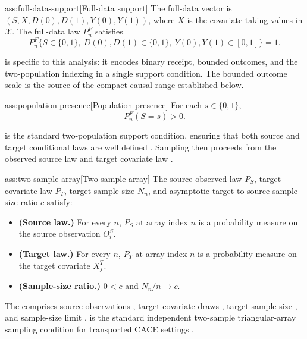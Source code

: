 \documentclass[11pt]{article}
\begin{document}
\begin{assumptionv}{ass:full-data-support}[Full-data support]
The full-data vector is \((S,X,D(0),D(1),Y(0),Y(1))\), where \(X\) is the covariate taking values in \(\mathcal X\). The full-data law \(P_n^F\) satisfies
\[
P_n^F\{S\in\{0,1\},\ D(0),D(1)\in\{0,1\},\ Y(0),Y(1)\in[0,1]\}=1.
\]
\end{assumptionv}

 is specific to this analysis: it encodes binary receipt, bounded outcomes, and the two-population indexing in a single support condition. The bounded outcome scale is the source of the compact causal range established below.

\begin{assumptionv}{ass:population-presence}[Population presence]
For each \(s\in\{0,1\}\),
\[
P_n^F(S=s)>0.
\]
\end{assumptionv}

 is the standard two-population support condition, ensuring that both source and target conditional laws are well defined \citep{ChenHuang2025}. Sampling then proceeds from the observed source law  and target covariate law .

\begin{assumptionv}{ass:two-sample-array}[Two-sample array]
The source observed law \(P_S\), target covariate law \(P_T\), target sample size \(N_n\), and asymptotic target-to-source sample-size ratio \(c\) satisfy:
\begin{itemize}
\item \textbf{(Source law.)} For every \(n\), \(P_S\) at array index \(n\) is a probability measure on the source observation \(O_i^S\).
\item \textbf{(Target law.)} For every \(n\), \(P_T\) at array index \(n\) is a probability measure on the target covariate \(X_j^T\).
\item \textbf{(Sample-size ratio.)} \(0<c\) and \(N_n/n\to c\).
\end{itemize}
\end{assumptionv}

The  comprises source observations , target covariate draws , target sample size , and sample-size limit .  is the standard independent two-sample triangular-array sampling condition for transported CACE settings \citep{ChenHuang2025}.
\end{document}
